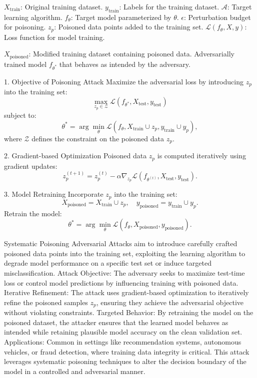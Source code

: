 
$X_{\text{train}}$: Original training dataset.
$y_{\text{train}}$: Labels for the training dataset.
$\mathcal{A}$: Target learning algorithm.
$f_{\theta}$: Target model parameterized by $\theta$.
$\epsilon$: Perturbation budget for poisoning.
$z_p$: Poisoned data points added to the training set.
$\mathcal{L}(f_{\theta}, X, y)$: Loss function for model training.

$X_{\text{poisoned}}$: Modified training dataset containing poisoned data.
Adversarially trained model $f_{\theta^{\ast}}$ that behaves as intended by the adversary.

1. Objective of Poisoning Attack
Maximize the adversarial loss by introducing $z_p$ into the training set:
\[
\max_{z_p \in \mathcal{Z}} \mathcal{L}(f_{\theta^{\ast}}, X_{\text{test}}, y_{\text{test}})
\]
subject to:
\[
\theta^{\ast} = \arg \min_{\theta} \mathcal{L}(f_{\theta}, X_{\text{train}} \cup z_p, y_{\text{train}} \cup y_p),
\]
where $\mathcal{Z}$ defines the constraint on the poisoned data $z_p$.

2. Gradient-based Optimization
Poisoned data $z_p$ is computed iteratively using gradient updates:
\[
z_p^{(t+1)} = z_p^{(t)} - \alpha \nabla_{z_p} \mathcal{L}(f_{\theta^{(t)}}, X_{\text{test}}, y_{\text{test}}).
\]

3. Model Retraining
Incorporate $z_p$ into the training set:
\[
X_{\text{poisoned}} = X_{\text{train}} \cup z_p, \quad y_{\text{poisoned}} = y_{\text{train}} \cup y_p.
\]
Retrain the model:
\[
\theta^{\ast} = \arg \min_{\theta} \mathcal{L}(f_{\theta}, X_{\text{poisoned}}, y_{\text{poisoned}}).
\]

Systematic Poisoning Adversarial Attacks aim to introduce carefully crafted poisoned data points into the training set, exploiting the learning algorithm to degrade model performance on a specific test set or induce targeted misclassification.
Attack Objective: The adversary seeks to maximize test-time loss or control model predictions by influencing training with poisoned data.
Iterative Refinement: The attack uses gradient-based optimization to iteratively refine the poisoned samples $z_p$, ensuring they achieve the adversarial objective without violating constraints.
Targeted Behavior: By retraining the model on the poisoned dataset, the attacker ensures that the learned model behaves as intended while retaining plausible model accuracy on the clean validation set.
Applications: Common in settings like recommendation systems, autonomous vehicles, or fraud detection, where training data integrity is critical. This attack leverages systematic poisoning techniques to alter the decision boundary of the model in a controlled and adversarial manner.